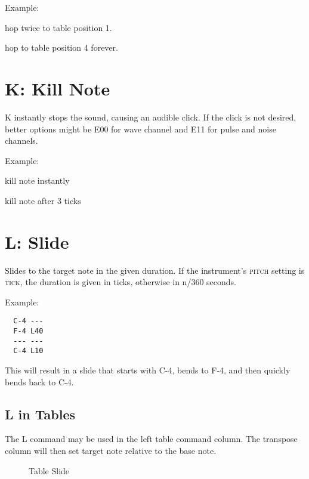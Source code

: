 \begin{description}
\item Example:
\item[H21] hop twice to table position 1.
\item[H04] hop to table position 4 forever.
\end{description}

\section{K: Kill Note}

K instantly stops the sound, causing an audible click. If the click is not desired, better options might be E00 for wave channel and E11 for pulse and noise channels.

\begin{description}
\item Example:
\item[K00] kill note instantly
\item[K03] kill note after 3 ticks
\end{description}

\section{L: Slide}

Slides to the target note in the given duration. If the instrument's \textsc{pitch} setting is \textsc{tick}, the duration is given in ticks, otherwise in n/360 seconds.

Example:

\begin{verbatim}
  C-4 ---
  F-4 L40
  --- ---
  C-4 L10
\end{verbatim}

This will result in a slide that starts with C-4, bends to F-4, and then quickly bends back to C-4.

\subsection{L in Tables}

The L command may be used in the left table command column. The transpose column will then set target note relative to the base note.

\begin{figure}[htbp]
	\begin{center}
		\caption{Table Slide}
	\end{center}
\end{figure}

